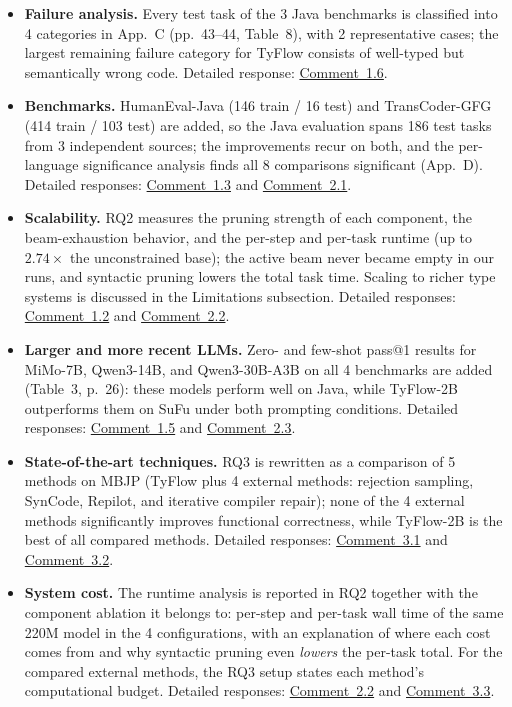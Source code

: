 \documentclass[11pt,a4paper]{article}
\newcommand{\commentref}[1]{\hyperref[com:#1]{Comment~#1}}
\begin{document}
\begin{itemize}[leftmargin=1.4em]
  \item \textbf{Failure analysis.} Every test task of the 3 Java benchmarks is classified into 4 categories in App.~C (pp.~43--44, Table~8), with 2 representative cases; the largest remaining failure category for TyFlow consists of well-typed but semantically wrong code. Detailed response: \commentref{1.6}.
  \item \textbf{Benchmarks.} HumanEval-Java (146 train / 16 test) and TransCoder-GFG (414 train / 103 test) are added, so the Java evaluation spans 186 test tasks from 3 independent sources; the improvements recur on both, and the per-language significance analysis finds all 8 comparisons significant (App.~D). Detailed responses: \commentref{1.3} and \commentref{2.1}.
  \item \textbf{Scalability.} RQ2 measures the pruning strength of each component, the beam-exhaustion behavior, and the per-step and per-task runtime (up to $2.74\times$ the unconstrained base); the active beam never became empty in our runs, and syntactic pruning lowers the total task time. Scaling to richer type systems is discussed in the Limitations subsection. Detailed responses: \commentref{1.2} and \commentref{2.2}.
  \item \textbf{Larger and more recent LLMs.} Zero- and few-shot pass@1 results for MiMo-7B, Qwen3-14B, and Qwen3-30B-A3B on all 4 benchmarks are added (Table~3, p.~26): these models perform well on Java, while TyFlow-2B outperforms them on SuFu under both prompting conditions. Detailed responses: \commentref{1.5} and \commentref{2.3}.
  \item \textbf{State-of-the-art techniques.} RQ3 is rewritten as a comparison of 5 methods on MBJP (TyFlow plus 4 external methods: rejection sampling, SynCode, Repilot, and iterative compiler repair); none of the 4 external methods significantly improves functional correctness, while TyFlow-2B is the best of all compared methods. Detailed responses: \commentref{3.1} and \commentref{3.2}.
  \item \textbf{System cost.} The runtime analysis is reported in RQ2 together with the component ablation it belongs to: per-step and per-task wall time of the same 220M model in the 4 configurations, with an explanation of where each cost comes from and why syntactic pruning even \emph{lowers} the per-task total. For the compared external methods, the RQ3 setup states each method's computational budget. Detailed responses: \commentref{2.2} and \commentref{3.3}.
\end{itemize}
\end{document}
